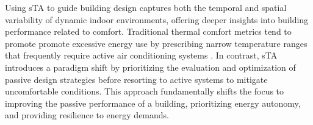\vspace{0.25cm}

Using sTA to guide building design captures both the temporal and spatial variability of dynamic indoor environments, offering deeper insights into building performance related to comfort. Traditional thermal comfort metrics tend to promote promote excessive energy use by prescribing narrow temperature ranges that frequently require active air conditioning systems \citep{arens_are_2010}. In contrast, sTA introduces a paradigm shift by prioritizing the evaluation and optimization of passive design strategies before resorting to active systems to mitigate uncomfortable conditions. This approach fundamentally shifts the focus to improving the passive performance of a building, prioritizing energy autonomy, and providing resilience to energy demands.


